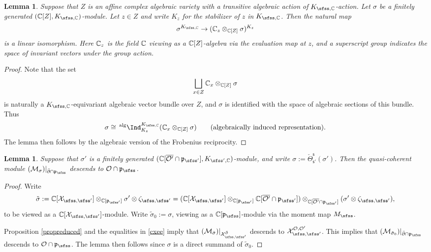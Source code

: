 \documentclass[12pt,a4paper]{amsart}
\newcommand{\CM}{{\mathcal {M}}}
\newcommand{\CO}{{\mathcal {O}}}
\newcommand{\CX}{{\mathcal {X}}}
\newcommand{\p}{\mathfrak p}
\numberwithin{equation}{section}
\newtheorem{lem}[thm]{Lemma}
\theoremstyle{remark}
\begin{document}
\begin{lem}\label{geotheta2}
Suppose that  $Z$ is an affine complex algebraic variety with a transitive algebraic action of $K_{\sfss, \C}$-action. Let $\sigma$ be a finitely generated $(\C[Z], K_{\sfss, \C})$-module.
Let $z\in Z$ and write $K_z$ for the stabilizer of $z$ in $K_{\sfss, \C}$. Then  the natural map
\[
  \sigma^{K_{\sfss, \C}}\rightarrow (\C_z\otimes_{\C[Z]} \sigma)^{K_{z}}
\]
is a linear isomorphism. Here $\mathbb{C}_z$ is the field $\mathbb{C}$ viewing as a $\mathbb{C}[Z]$-algebra via the evaluation map at $z$, and a superscript group indicates the space of  invariant vectors under the group action.
\end{lem}
\begin{proof}
Note that the set
\[
 \bigsqcup_{x\in Z} \mathbb{C}_x\otimes_{\mathbb{C}[Z]} \sigma
\]
is naturally a $K_{\sfss, \C}$-equivariant algebraic vector bundle over $Z$, and  $\sigma$ is identified with the space of algebraic sections of this bundle. Thus
\[
  \sigma\cong \,^{\mathrm{alg}}\Ind_{K_z}^{K_{\sfss, \C}}(\C_x\otimes_{\C[Z]}\sigma)\qquad(\textrm{algebraically induced representation}).
\]
The lemma then follows by the algebraic version of the Frobenius reciprocity.
\end{proof}


\begin{lem}\label{geotheta3}
Suppose that $\sigma'$ is a finitely generated  $(\C[\overline{\CO'}\cap \p_{\sfss'}], K_{\sfss', \C})$-module, and write $\sigma:=\check \Theta_{\mathsf s'}^{\mathsf s}(\sigma')$. Then the  quasi-coherent module $(\CM_\sigma)|_{\bar \partial \cap \p_\sfss}$ descends  to $\CO\cap \p_\sfss$.
\end{lem}
\begin{proof}
Write
\[
 \tilde \sigma:=\C[\CX_{\sfss, \sfss'}]\otimes_{\C[\p_{\sfss'}]} \sigma'\otimes \zeta_{\sfss, \sfss'}=(\C[\CX_{\sfss, \sfss'}]\otimes_{\C[\p_{\sfss'}]} {\C[\overline{\CO'}\cap \p_{\sfss'}]})\otimes_{\C[\overline{\CO'}\cap \p_{\sfss'}]}(\sigma'\otimes \zeta_{\sfss, \sfss'}),
\]
to be viewed as a $\C[\CX_{\sfss, \sfss'}]$-module. Write $\tilde \sigma_0:=\sigma$, viewing as a $\C[\p_\sfss]$-module via the moment map $M_\sfss$.

Proposition \ref{propreduced} and the equalities  in \eqref{cxee} imply that
$(\CM_{ \tilde \sigma})|_{\CX_{\sfss, \sfss'}^{\bar \partial}}$ descends to $ \CX_{\sfss, \sfss'}^{\CO, \CO'}$. This implies that $(\CM_{ \tilde \sigma_0})|_{\bar \partial\cap \p_\sfss}$ descends to $ \CO\cap \p_\sfss$. The lemma then follows since $\sigma$ is a direct summand of $\tilde \sigma_0$.
\end{proof}
\end{document}
